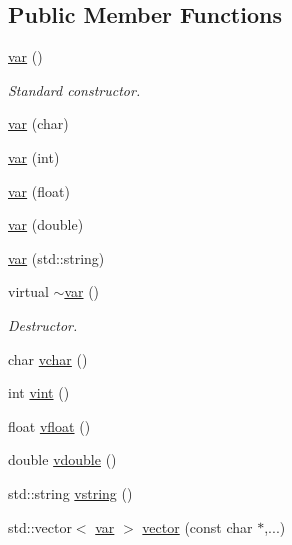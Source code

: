 \subsection*{Public Member Functions}
\begin{DoxyCompactItemize}
\item 
\hyperlink{classvar_af87bf2817f89678071ac7588a85a7f36}{var} ()
\begin{DoxyCompactList}\small\item\em Standard constructor. \item\end{DoxyCompactList}\item 
\hyperlink{classvar_a4afcdfc96cfac4b68e92415698f7e9de}{var} (char)
\item 
\hyperlink{classvar_a5fc966797c6c91705d714f5401b18eee}{var} (int)
\item 
\hyperlink{classvar_ab11a35ca2d25eed124494fc27f29f311}{var} (float)
\item 
\hyperlink{classvar_ad1a961ff2bb77b5e19d774a90974b17d}{var} (double)
\item 
\hyperlink{classvar_a84b88cbf0dc21a204a458b33133325d2}{var} (std::string)
\item 
virtual \hyperlink{classvar_ac7d2944f98e9772ab540050ae22fe9d1}{$\sim$var} ()
\begin{DoxyCompactList}\small\item\em Destructor. \item\end{DoxyCompactList}\item 
char \hyperlink{classvar_af5c2865eb834ce2d22991a3250d278ba}{vchar} ()
\item 
int \hyperlink{classvar_a84535a30ae85f19acb935fcc98a03abf}{vint} ()
\item 
float \hyperlink{classvar_ac811c23f3fcb941746c1dd419e68b501}{vfloat} ()
\item 
double \hyperlink{classvar_aabcdbcace1882ed0c6506deabf4eddcb}{vdouble} ()
\item 
std::string \hyperlink{classvar_ada169cb1305db45a1de31071ce5033e2}{vstring} ()
\item 
std::vector$<$ \hyperlink{classvar}{var} $>$ \hyperlink{classvar_a1fe5529702a2697eb8cf69e8f80b0d86}{vector} (const char $\ast$,...)
\end{DoxyCompactItemize}
